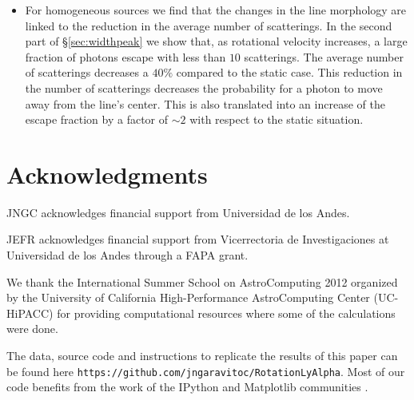 \documentclass{emulateapj}
\begin{document}
\begin{itemize}
\item For homogeneous sources we find that the changes in the
line morphology are linked to the reduction in the average number of
scatterings. In the second part of \S \ref{sec:widthpeak} we show
that, as rotational velocity increases, a large fraction of photons
escape with less than $10$ scatterings. The average number of
scatterings decreases a $40\%$ compared to the static case. 
This reduction in the number of scatterings decreases the probability
for a photon to move away from the line's center. This is also
translated into an increase of the escape fraction by a factor of
$\sim 2$ with respect to the static situation.

\end{itemize}


\section*{Acknowledgments}

JNGC acknowledges financial support from Universidad de los
Andes. 

JEFR acknowledges financial support from Vicerrectoria de
Investigaciones at Universidad de los Andes through a FAPA grant.

We thank the International Summer School on AstroComputing
2012 organized by the University of California High-Performance
AstroComputing Center (UC-HiPACC) for providing computational
resources where some of the calculations were done. 

The data, source code and instructions to
replicate the results of this paper can be found
here {\texttt{https://github.com/jngaravitoc/RotationLyAlpha}}.
Most of our code benefits from the work of the IPython and Matplotlib
communities \citep{IPython,matplotlib}.





 
\end{document}
